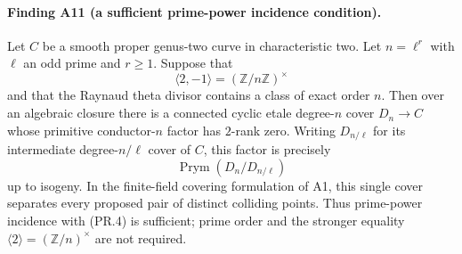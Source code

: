 \paragraph{Finding A11 (a sufficient prime-power incidence condition).}
Let $C$ be a smooth proper genus-two curve in characteristic two.
Let $n=\ell^r$ with $\ell$ an odd prime and $r\ge1$. Suppose that
\[
 \langle 2,-1\rangle=(\mathbb Z/n\mathbb Z)^\times
 \tag{PR.4}
\]
and that the Raynaud theta divisor contains a class of exact order
$n$. Then over an algebraic closure there is a connected cyclic etale
degree-$n$ cover $D_n\to C$ whose primitive conductor-$n$ factor has $2$-rank zero.
Writing $D_{n/\ell}$ for its intermediate degree-$n/\ell$ cover of
$C$, this factor is precisely
\[
 \operatorname{Prym}(D_n/D_{n/\ell})
\]
up to isogeny. In the finite-field covering formulation of A1, this
single cover separates every proposed pair of distinct colliding
points. Thus prime-power incidence with (PR.4) is sufficient; prime
order and the stronger equality $\langle2\rangle=(\mathbb Z/n)^\times$
are not required.

